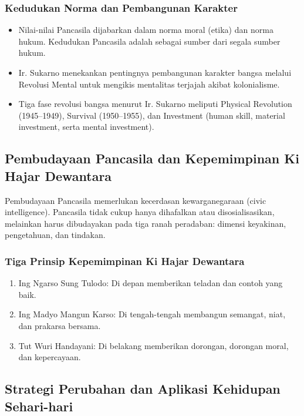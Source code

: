 \subsubsection{Kedudukan Norma dan Pembangunan Karakter}
\begin{itemize}
\item Nilai-nilai Pancasila dijabarkan dalam norma moral (etika) dan norma hukum. Kedudukan Pancasila adalah sebagai sumber dari segala sumber hukum.
\item Ir. Sukarno menekankan pentingnya pembangunan karakter bangsa melalui Revolusi Mental untuk mengikis mentalitas terjajah akibat kolonialisme.
\item Tiga fase revolusi bangsa menurut Ir. Sukarno meliputi Physical Revolution (1945--1949), Survival (1950--1955), dan Investment (human skill, material investment, serta mental investment).
\end{itemize}

\subsection{Pembudayaan Pancasila dan Kepemimpinan Ki Hajar Dewantara}

Pembudayaan Pancasila memerlukan kecerdasan kewarganegaraan (civic intelligence). Pancasila tidak cukup hanya dihafalkan atau disosialisasikan, melainkan harus dibudayakan pada tiga ranah peradaban: dimensi keyakinan, pengetahuan, dan tindakan.

\subsubsection{Tiga Prinsip Kepemimpinan Ki Hajar Dewantara}
\begin{enumerate}
\item Ing Ngarso Sung Tulodo: Di depan memberikan teladan dan contoh yang baik.
\item Ing Madyo Mangun Karso: Di tengah-tengah membangun semangat, niat, dan prakarsa bersama.
\item Tut Wuri Handayani: Di belakang memberikan dorongan, dorongan moral, dan kepercayaan.
\end{enumerate}

\subsection{Strategi Perubahan dan Aplikasi Kehidupan Sehari-hari}

